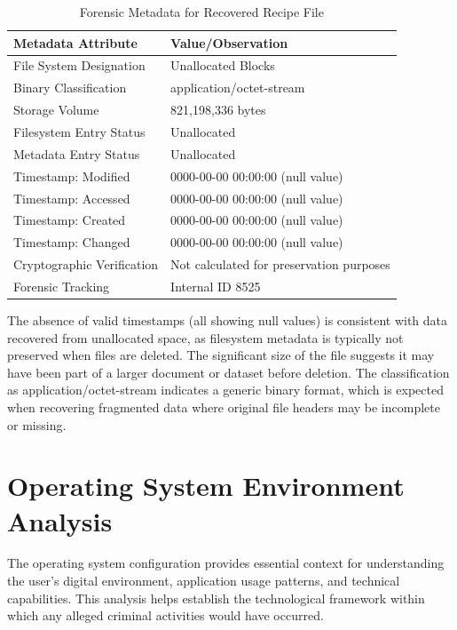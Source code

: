 \begin{table}[htbp]
\centering
\begin{tabular}{|p{4cm}|p{8cm}|}
\hline
\textbf{Metadata Attribute} & \textbf{Value/Observation} \\
\hline
File System Designation & Unallocated Blocks \\
\hline
Binary Classification & application/octet-stream \\
\hline
Storage Volume & 821,198,336 bytes \\
\hline
Filesystem Entry Status & Unallocated \\
\hline
Metadata Entry Status & Unallocated \\
\hline
Timestamp: Modified & 0000-00-00 00:00:00 (null value) \\
\hline
Timestamp: Accessed & 0000-00-00 00:00:00 (null value) \\
\hline
Timestamp: Created & 0000-00-00 00:00:00 (null value) \\
\hline
Timestamp: Changed & 0000-00-00 00:00:00 (null value) \\
\hline
Cryptographic Verification & Not calculated for preservation purposes \\
\hline
Forensic Tracking & Internal ID 8525 \\
\hline
\end{tabular}
\caption{Forensic Metadata for Recovered Recipe File}
\label{table:recovered_file_metadata}
\end{table}

The absence of valid timestamps (all showing null values) is consistent with data recovered from unallocated space, as filesystem metadata is typically not preserved when files are deleted. The significant size of the file suggests it may have been part of a larger document or dataset before deletion. The classification as application/octet-stream indicates a generic binary format, which is expected when recovering fragmented data where original file headers may be incomplete or missing.

\section{Operating System Environment Analysis}
The operating system configuration provides essential context for understanding the user's digital environment, application usage patterns, and technical capabilities. This analysis helps establish the technological framework within which any alleged criminal activities would have occurred.

